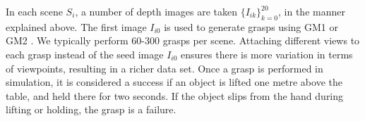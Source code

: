 
In each scene $S_i$, a number of depth images are taken $\{I_{ik}\}_{k=0}^{20}$, in the manner explained above. The first image $I_{i0}$ is used to generate grasps using GM1 \cite{kopicki2015ijrr} or GM2 \cite{kopicki2019ijrr}. We typically perform 60-300 grasps per scene. Attaching different views to each grasp instead of the seed image $I_{i0}$ ensures there is more variation in terms of viewpoints, resulting in a richer data set. Once a grasp is performed in simulation, it is considered a success if an object is lifted one metre above the table, and held there for two seconds. If the object slips from the hand during lifting or holding, the grasp is a failure. 

